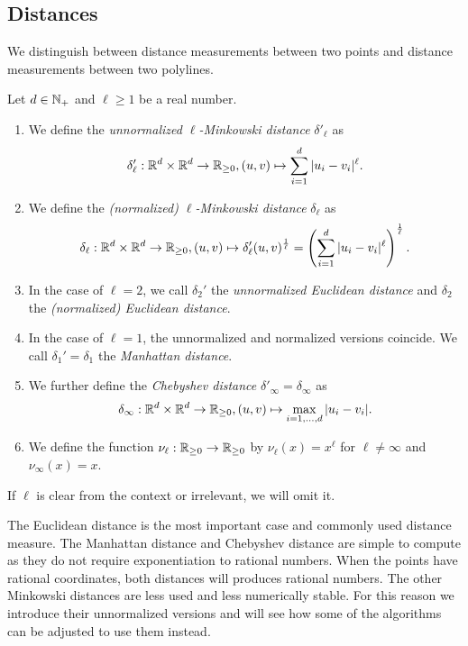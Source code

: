 \subsection{Distances}
\label{ssec:distances}
We distinguish between distance measurements between two points and distance measurements between two polylines. 
\begin{definition}[Distances]\label{def:point_distance}
  Let \(d \in \mathbb{N}_+\) and \(\ell \geq 1\) be a real number.
  \begin{enumerate}
    \item We define the \emph{unnormalized \(\ell\)-Minkowski distance} \(\delta'_\ell\) as 
      \[\delta'_\ell:\mathbb{R}^d \times \mathbb{R}^d \to \mathbb{R}_{\geq 0}, (u, v) \mapsto \sum_{i = 1}^d |u_i - v_i|^\ell.\]
    \item We define the \emph{(normalized) \(\ell\)-Minkowski distance} \(\delta_\ell\) as 
      \[\delta_\ell:\mathbb{R}^d \times \mathbb{R}^d \to \mathbb{R}_{\geq 0}, (u, v) \mapsto \delta'_\ell(u, v)^{\frac1\ell} = \left(\sum_{i = 1}^d |u_i - v_i|^\ell\right)^{\frac1\ell}.\]
    \item In the case of \(\ell = 2\), we call \(\delta_2'\)  the \emph{unnormalized Euclidean distance} and \(\delta_2\) the \emph{(normalized) Euclidean distance}.
    \item In the case of \(\ell = 1\), the unnormalized and normalized versions coincide. We call \(\delta_1' = \delta_1\) the \emph{Manhattan distance}. 
    \item We further define the \emph{Chebyshev distance} \(\delta'_\infty = \delta_\infty\) as 
      \[\delta_\infty:\mathbb{R}^d \times \mathbb{R}^d \to \mathbb{R}_{\geq 0}, (u, v) \mapsto \max_{i = 1, \dots, d} |u_i - v_i|.\]
    \item We define the function \(\nu_\ell:\mathbb{R}_{\geq 0} \to \mathbb{R}_{\geq 0}\) by \(\nu_\ell(x) = x^\ell\) for \(\ell \neq \infty\) and \(\nu_\infty(x) = x\).
  \end{enumerate}

  If \(\ell\) is clear from the context or irrelevant, we will omit it.
\end{definition}

The Euclidean distance is the most important case and commonly used distance measure. The Manhattan distance and Chebyshev distance are simple to compute as they do not require exponentiation to rational numbers. When the points have rational coordinates, both distances will produces rational numbers.
The other Minkowski distances are less used and less numerically stable. For this reason we introduce their unnormalized versions and will see how some of the algorithms can be adjusted to use them instead. 

